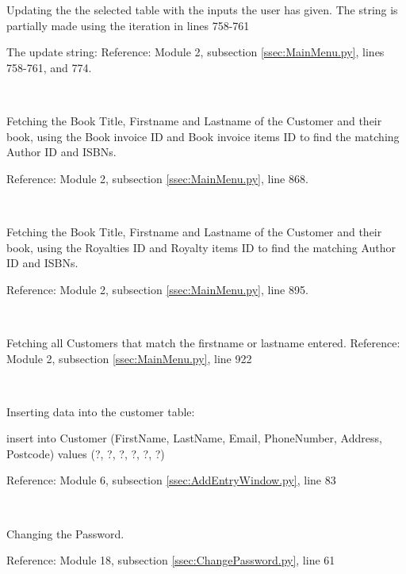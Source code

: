 Updating the the selected table with the inputs the user has given. The string is partially made using the iteration in lines 758-761


The update string:
Reference: Module 2,  subsection \ref{ssec:MainMenu.py}, lines 758-761, and 774.

\

Fetching the Book Title, Firstname and Lastname of the Customer and their book, using the Book invoice ID and Book invoice items ID to find the matching Author ID and ISBNs.
\begin{scriptsize}
\end{scriptsize}
Reference: Module 2,  subsection \ref{ssec:MainMenu.py}, line 868.

\

Fetching the Book Title, Firstname and Lastname of the Customer and their book, using the Royalties ID and Royalty items ID to find the matching Author ID and ISBNs.
\begin{tiny}
\end{tiny}
Reference: Module 2,  subsection \ref{ssec:MainMenu.py}, line 895.

\

Fetching all Customers that match the firstname or lastname entered.
Reference: Module 2,  subsection \ref{ssec:MainMenu.py}, line 922

\

Inserting data into the customer table:
\begin{sql}
insert into Customer 
(FirstName, LastName, Email, PhoneNumber, Address, Postcode) 
values (?, ?, ?, ?, ?, ?)
\end{sql}
Reference: Module 6,  subsection \ref{ssec:AddEntryWindow.py}, line 83

\

Changing the Password.
\begin{tiny}
\end{tiny}
Reference: Module 18,  subsection \ref{ssec:ChangePassword.py}, line 61

